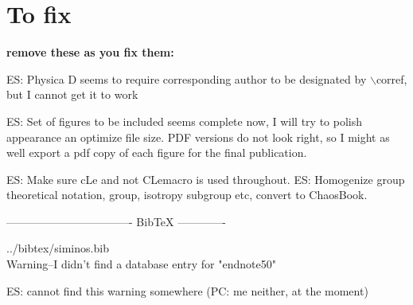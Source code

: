
\section*{To fix}

{\bf remove these as you fix them:}

ES: Physica D seems to require corresponding author to be designated by $\backslash$corref, but I cannot get it to work

ES: Set of figures to be included seems complete now, I will try to polish appearance an optimize file size.
    PDF versions do not look right, so I might as well export a pdf copy of each figure for the final publication.

ES: Make sure cLe and not CLemacro is used throughout.
ES: Homogenize group theoretical notation, group, isotropy subgroup etc, convert to ChaosBook.

---------------------------------- BibTeX -------------

../bibtex/siminos.bib
\\
Warning--I didn't find a database entry for "endnote50"

ES: cannot find this warning somewhere 
(PC: me neither, at the moment)